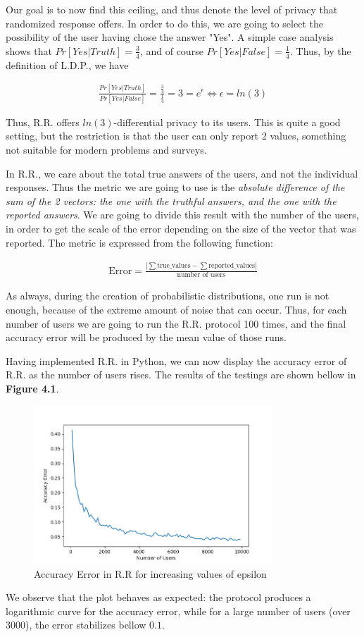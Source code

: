 Our goal is to now find this ceiling, and thus denote the level of privacy that randomized response offers. In order to do this, we are going to select the possibility of the user having chose the answer "Yes". A simple case analysis shows that $Pr[Yes | Truth] = \frac{3}{4}$, and of course $Pr[Yes | False] = \frac{1}{4}$. Thus, by the definition of L.D.P., we have 

\begin{align*}
    \frac{Pr[Yes | Truth]}{Pr[Yes | False]} = \frac{\frac{3}{4}}{\frac{1}{4}} = 3 = e^\epsilon \Longleftrightarrow \epsilon = ln(3)
\end{align*}

Thus, R.R. offers  $ln(3)$-differential privacy to its users. This is quite a good setting, but the restriction is that the user can only report 2 values, something not suitable for modern problems and surveys. 



In R.R., we care about the total true answers of the users, and not the individual responses. Thus the metric we are going to use is the \emph{absolute difference of the sum of the 2 vectors: the one with the truthful answers, and the one with the reported answers}. We are going to divide this result with the number of the users, in order to get the scale of the error depending on the size of the vector that was reported. The metric is expressed from the following function:

\begin{align*}
    \text{Error} = \frac{|\sum \text{true\_values} - \sum \text{reported\_values}| }{\text{number\ of \ users}}
\end{align*}

As always, during the creation of probabilistic distributions, one run is not enough, because of the extreme amount of noise that can occur. Thus, for each number of users we are going to run the R.R. protocol 100 times, and the final accuracy error will be produced by the mean value of those runs.

Having implemented R.R. in Python, we can now display the accuracy error of R.R. as the number of users rises. The results of the testings are shown bellow in \textbf{Figure 4.1}.

\begin{figure}[!htb]\centering
    \includegraphics[width=0.8\textwidth]{images/rr_results.png}
    \caption{Accuracy Error in R.R for increasing values of epsilon}
\end{figure}


We observe that the plot behaves as expected: the protocol produces a logarithmic curve for the accuracy error, while for a large number of users (over 3000), the error stabilizes bellow $0.1$. 